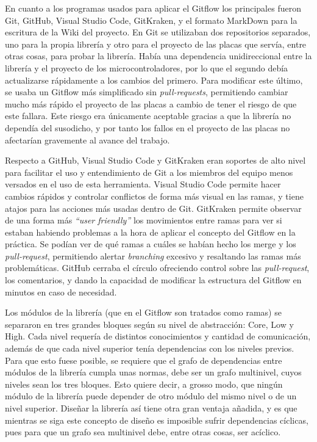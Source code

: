 \documentclass{report}
\begin{document}
En cuanto a los programas usados para aplicar el Gitflow los principales fueron Git, GitHub, Visual Studio Code, GitKraken, y el formato MarkDown para la escritura de la Wiki del proyecto. En Git se utilizaban dos repositorios separados, uno para la propia librería y otro para el proyecto de las placas que servía, entre otras cosas, para probar la librería. Había una dependencia unidireccional entre la librería y el proyecto de los microcontroladores, por lo que el segundo debía actualizarse rápidamente a los cambios del primero. Para modificar este último, se usaba un Gitflow más simplificado sin \textit{pull-requests}, permitiendo cambiar mucho más rápido el proyecto de las placas a cambio de tener el riesgo de que este fallara. Este riesgo era únicamente aceptable gracias a que la librería no dependía del susodicho, y por tanto los fallos en el proyecto de las placas no afectarían gravemente al avance del trabajo. \par
Respecto a GitHub, Visual Studio Code y GitKraken eran soportes de alto nivel para facilitar el uso y entendimiento de Git a los miembros del equipo menos versados en el uso de esta herramienta. Visual Studio Code permite hacer cambios rápidos y controlar conflictos de forma más visual en las ramas, y tiene atajos para las acciones más usadas dentro de Git. GitKraken permite observar de una forma más \textit{``user friendly''} los movimientos entre ramas para ver si estaban habiendo problemas a la hora de aplicar el concepto del Gitflow en la práctica. Se podían ver de qué ramas a cuáles se habían hecho los merge y los \textit{pull-request}, permitiendo alertar \textit{branching} excesivo y resaltando las ramas más problemáticas. GitHub cerraba el círculo ofreciendo control sobre las \textit{pull-request}, los comentarios, y dando la capacidad de modificar la estructura del Gitflow en minutos en caso de necesidad.
\par \vspace{0.3 cm}
Los módulos de la librería (que en el Gitflow son tratados como ramas) se separaron en tres grandes bloques según su nivel de abstracción: Core, Low y High. Cada nivel requería de distintos conocimientos y cantidad de comunicación, además de que cada nivel superior tenía dependencias con los niveles previos. Para que esto fuese posible, se requiere que el grafo de dependencias entre módulos de la librería cumpla unas normas, debe ser un grafo multinivel, cuyos niveles sean los tres bloques. Esto quiere decir, a grosso modo, que ningún módulo de la librería puede depender de otro módulo del mismo nivel o de un nivel superior. Diseñar la librería así tiene otra gran ventaja añadida, y es que mientras se siga este concepto de diseño es imposible sufrir dependencias cíclicas, pues para que un grafo sea multinivel debe, entre otras cosas, ser acíclico. \par
\end{document}
